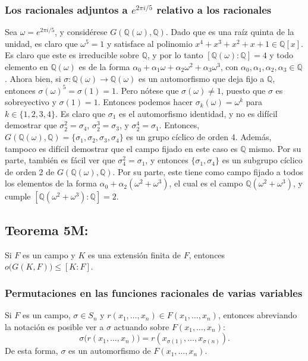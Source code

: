 \documentclass{article}
\begin{document}
\subsubsection*{\color{teal} Los racionales adjuntos a $e^{2\pi i/5}$ relativo a los racionales}

Sea $\omega=e^{2\pi i/5}$, y considérese $G(\mathbb{Q}(\omega),\mathbb{Q})$. Dado que es una raíz quinta de la unidad, es claro que $\omega^5=1$ y satisface al polinomio $x^4+x^3+x^2+x+1\in\mathbb{Q}[x]$. Es claro que este es irreducible sobre $\mathbb{Q}$, y por lo tanto $[\mathbb{Q}(\omega):\mathbb{Q}]=4$ y todo elemento en $\mathbb{Q}(\omega)$ es de la forma $\alpha_0+\alpha_1\omega+\alpha_2\omega^2+\alpha_3\omega^3$, con $\alpha_0,\alpha_1,\alpha_2,\alpha_3\in\mathbb{Q}$. Ahora bien, si $\sigma:\mathbb{Q}(\omega)\to\mathbb{Q}(\omega)$ es un automorfismo que deja fijo a $\mathbb{Q}$, entonces $\sigma(\omega)^5=\sigma(1)=1$. Pero nótese que $\sigma(\omega)\neq1$, puesto que $\sigma$ es sobreyectivo y $\sigma(1)=1$. Entonces podemos hacer $\sigma_k(\omega)=\omega^k$ para $k\in\{1,2,3,4\}$. Es claro que $\sigma_1$ es el automorfismo identidad, y no es difícil demostrar que $\sigma_2^2=\sigma_4$, $\sigma_2^3=\sigma_3$, y $\sigma_2^4=\sigma_1$. Entonces, $G(\mathbb{Q}(\omega),\mathbb{Q})=\{\sigma_1,\sigma_2,\sigma_3,\sigma_4\}$ es un grupo cíclico de orden 4. Además, tampoco es difícil demostrar que el campo fijado en este caso es $\mathbb{Q}$ mismo. Por su parte, también es fácil ver que $\sigma_4^2=\sigma_1$, y entonces $\{\sigma_1,\sigma_4\}$ es un subgrupo cíclico de orden 2 de $G(\mathbb{Q}(\omega),\mathbb{Q})$. Por su parte, este tiene como campo fijado a todos los elementos de la forma $\alpha_0+\alpha_2(\omega^2+\omega^3)$, el cual es el campo $\mathbb{Q}(\omega^2+\omega^3)$, y cumple $[\mathbb{Q}(\omega^2+\omega^3):\mathbb{Q}]=2$.

\subsection*{\color{red} Teorema 5M:}

Si $F$ es un campo y $K$ es una extensión finita de $F$, entonces $o\big(G(K,F)\big)\leq[K:F]$.

\subsubsection*{\color{teal} Permutaciones en las funciones racionales de varias variables}

Si $F$ es un campo, $\sigma\in S_n$ y $r(x_1,\ldots,x_n)\in F(x_1,\ldots,x_n)$, entonces abreviando la notación es posible ver a $\sigma$ actuando sobre $F(x_1,\ldots,x_n)$:
$$\sigma\big(r(x_1,\ldots,x_n)\big)=r(x_{\sigma(1)},\ldots,x_{\sigma(n)}).$$
De esta forma, $\sigma$ es un automorfismo de $F(x_1,\ldots,x_n)$.
\end{document}
